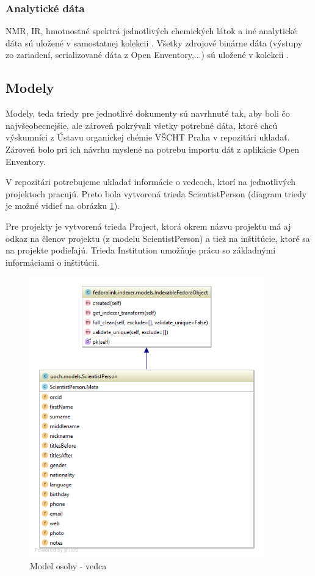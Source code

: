 \documentclass[thesis=M,slovak]{FITthesis}[2013/05/06]
\begin{document}
\subsubsection{Analytické dáta}
NMR, IR, hmotnostné spektrá jednotlivých chemických látok a iné analytické dáta sú uložené v samostatnej kolekcii . Všetky zdrojové binárne dáta (výstupy zo zariadení, serializované dáta z Open Enventory,...) sú uložené v kolekcii .

\subsection{Modely}
Modely, teda triedy pre jednotlivé dokumenty sú navrhnuté tak, aby boli čo najvšeobecnejšie, ale zároveň pokrývali všetky potrebné dáta, ktoré chcú výskumníci z Ústavu organickej chémie VŠCHT Praha v repozitári ukladať. Zároveň bolo pri ich návrhu myslené na potrebu importu dát z aplikácie Open Enventory.

V repozitári potrebujeme ukladať informácie o vedcoch, ktorí na jednotlivých projektoch pracujú. Preto bola vytvorená trieda ScientistPerson (diagram triedy je možné vidieť na obrázku \ref{graphics:ScientistPerson}).

Pre projekty je vytvorená trieda Project, ktorá okrem názvu projektu má aj odkaz na členov projektu (z modelu ScientistPerson) a tiež na inštitúcie, ktoré sa na projekte podieľajú. Trieda Institution umožňuje prácu so základnými informáciami o inštitúcii.

\begin{figure}\centering
	\includegraphics[width=0.9\textwidth]{diagramy/UOCH_ScientistPerson.png}
 	\caption[Model osoby - vedca]{Model osoby - vedca}\label{graphics:ScientistPerson}
\end{figure}
\end{document}
